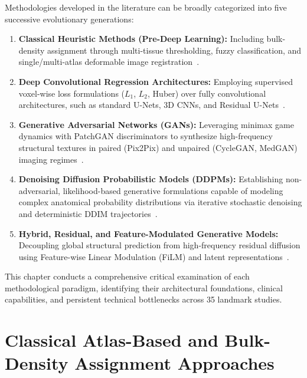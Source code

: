 Methodologies developed in the literature can be broadly categorized into five successive evolutionary generations:
\begin{enumerate}[label=\textbf{(\arabic*)}]
    \item \textbf{Classical Heuristic Methods (Pre-Deep Learning):} Including bulk-density assignment through multi-tissue thresholding, fuzzy classification, and single/multi-atlas deformable image registration~\cite{kapanen2013t1,sjolund2015comprehensive,gudur2014mri,korhonen2014evaluation,burgos2014multi,dowling2015automatic}.
    \item \textbf{Deep Convolutional Regression Architectures:} Employing supervised voxel-wise loss formulations ($L_1$, $L_2$, Huber) over fully convolutional architectures, such as standard U-Nets, 3D CNNs, and Residual U-Nets~\cite{han2017mr,ronneberger2015u,nie2016fully,zhang2018road,jin2019deep,dinkla2018mr,fu2019fast,arabi2018novel}.
    \item \textbf{Generative Adversarial Networks (GANs):} Leveraging minimax game dynamics with PatchGAN discriminators to synthesize high-frequency structural textures in paired (Pix2Pix) and unpaired (CycleGAN, MedGAN) imaging regimes~\cite{isola2017image,nie2017medical,wolterink2017deep,zhu2017unpaired,maspero2018dose,emami2018generating,yang2020synthetic,armanious2020medgan}.
    \item \textbf{Denoising Diffusion Probabilistic Models (DDPMs):} Establishing non-adversarial, likelihood-based generative formulations capable of modeling complex anatomical probability distributions via iterative stochastic denoising and deterministic DDIM trajectories~\cite{ho2020denoising,song2021denoising,dhariwal2021diffusion,saharia2022palette,lyu2022conversion,gong2023diffuse,dorjsembe2024diffusion,ozbey2023unsupervised}.
    \item \textbf{Hybrid, Residual, and Feature-Modulated Generative Models:} Decoupling global structural prediction from high-frequency residual diffusion using Feature-wise Linear Modulation (FiLM) and latent representations~\cite{kazerouni2023diffusion,peng2023towards,perez2018film,chung2023diffusion,thummerer2023synthrad2023}.
\end{enumerate}

This chapter conducts a comprehensive critical examination of each methodological paradigm, identifying their architectural foundations, clinical capabilities, and persistent technical bottlenecks across 35 landmark studies.

\section{Classical Atlas-Based and Bulk-Density Assignment Approaches}


